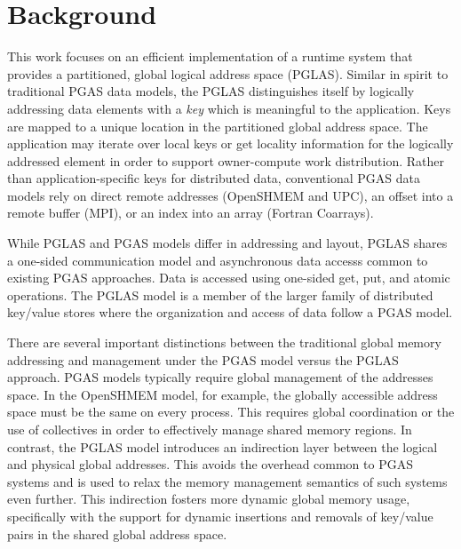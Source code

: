 \section{Background}

This work focuses on an efficient implementation of a runtime system that
provides a partitioned, global logical address space (PGLAS). Similar in spirit
to traditional PGAS data models, the PGLAS distinguishes itself by logically
addressing data elements with a {\em key} which is meaningful to the
application. Keys are mapped to a unique location in the partitioned global
address space. The application may iterate over local keys or get locality
information for the logically addressed element in order to support
owner-compute work distribution. Rather than application-specific keys for distributed
data, conventional PGAS data models rely on direct remote addresses (OpenSHMEM
and UPC), an offset into a remote buffer (MPI), or an index into an array
(Fortran Coarrays). 

While PGLAS and PGAS models differ in addressing and layout, PGLAS shares a
one-sided communication model and asynchronous data accesss common to existing
PGAS approaches. Data is accessed using one-sided get, put, and atomic operations.
The PGLAS model is a member of the larger family of distributed key/value stores where
the organization and access of data follow a PGAS model.


There are several important distinctions between the traditional global memory
addressing and management under the PGAS model versus the PGLAS approach. PGAS
models typically require global management of the addresses space. In the
OpenSHMEM model, for example, the globally accessible address space must be the
same on every process. This requires global coordination or the use of
collectives in order to effectively manage shared memory regions. In contrast,
the PGLAS model introduces an indirection layer between the logical and
physical global addresses. This avoids the overhead common to PGAS systems and
is used to relax the memory management semantics of such systems even further.
This indirection fosters more dynamic global memory usage, specifically with
the support for dynamic insertions and removals of key/value pairs in the
shared global address space. 

